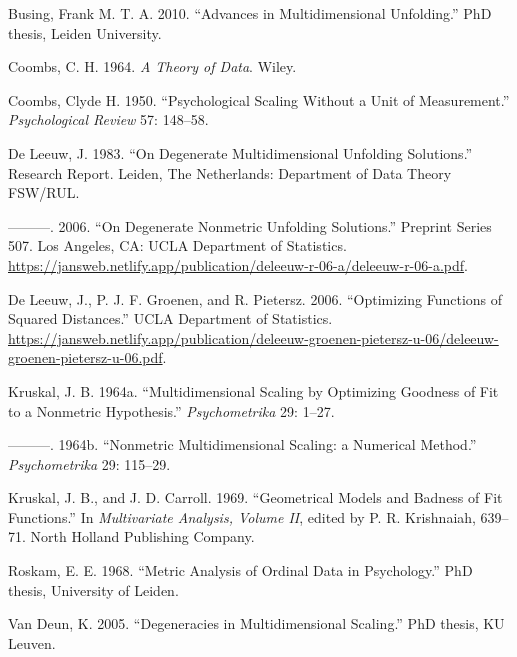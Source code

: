 \documentclass[
  12pt,
]{article}
\newlength{\cslhangindent}
\newenvironment{CSLReferences}[2] %
 {\begin{list}{}{%
  \setlength{\itemindent}{0pt}
  \setlength{\leftmargin}{0pt}
  \setlength{\parsep}{0pt}
  \ifodd #1
   \setlength{\leftmargin}{\cslhangindent}
   \setlength{\itemindent}{-1\cslhangindent}
  \fi
  \setlength{\itemsep}{#2\baselineskip}}}
 {\end{list}}
\begin{document}
\label{refs}
\begin{CSLReferences}{1}{0}
Busing, Frank M. T. A. 2010. {``Advances in Multidimensional Unfolding.''} PhD thesis, Leiden University.

Coombs, C. H. 1964. \emph{{A Theory of Data}}. Wiley.

Coombs, Clyde H. 1950. {``Psychological Scaling Without a Unit of Measurement.''} \emph{Psychological Review} 57: 148--58.

De Leeuw, J. 1983. {``{On Degenerate Multidimensional Unfolding Solutions}.''} Research Report. Leiden, The Netherlands: Department of Data Theory FSW/RUL.

---------. 2006. {``{On Degenerate Nonmetric Unfolding Solutions}.''} Preprint Series 507. Los Angeles, CA: UCLA Department of Statistics. \url{https://jansweb.netlify.app/publication/deleeuw-r-06-a/deleeuw-r-06-a.pdf}.

De Leeuw, J., P. J. F. Groenen, and R. Pietersz. 2006. {``{Optimizing Functions of Squared Distances}.''} UCLA Department of Statistics. \url{https://jansweb.netlify.app/publication/deleeuw-groenen-pietersz-u-06/deleeuw-groenen-pietersz-u-06.pdf}.

Kruskal, J. B. 1964a. {``{Multidimensional Scaling by Optimizing Goodness of Fit to a Nonmetric Hypothesis}.''} \emph{Psychometrika} 29: 1--27.

---------. 1964b. {``{Nonmetric Multidimensional Scaling: a Numerical Method}.''} \emph{Psychometrika} 29: 115--29.

Kruskal, J. B., and J. D. Carroll. 1969. {``{Geometrical Models and Badness of Fit Functions}.''} In \emph{Multivariate Analysis, Volume II}, edited by P. R. Krishnaiah, 639--71. North Holland Publishing Company.

Roskam, E. E. 1968. {``{Metric Analysis of Ordinal Data in Psychology}.''} PhD thesis, University of Leiden.

Van Deun, K. 2005. {``Degeneracies in Multidimensional Scaling.''} PhD thesis, KU Leuven.

\end{CSLReferences}
\end{document}
